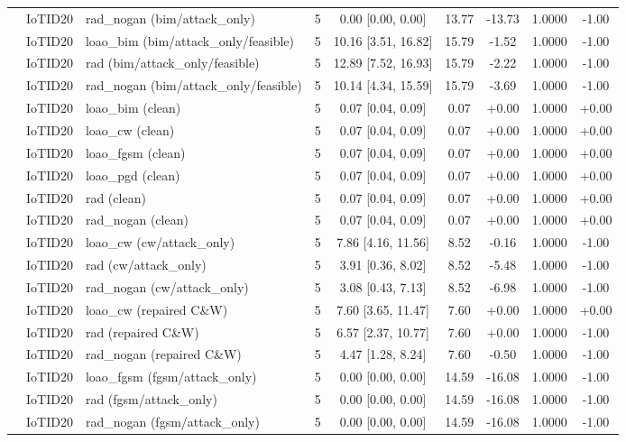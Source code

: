 \begin{table}[t]
\begin{tabular}{lllcccccc}
 & IoTID20 & rad\_nogan (bim/attack\_only) & 5 & 0.00 [0.00, 0.00] & 13.77 & -13.73 & 1.0000 & -1.00 \\
 & IoTID20 & loao\_bim (bim/attack\_only/feasible) & 5 & 10.16 [3.51, 16.82] & 15.79 & -1.52 & 1.0000 & -1.00 \\
 & IoTID20 & rad (bim/attack\_only/feasible) & 5 & 12.89 [7.52, 16.93] & 15.79 & -2.22 & 1.0000 & -1.00 \\
 & IoTID20 & rad\_nogan (bim/attack\_only/feasible) & 5 & 10.14 [4.34, 15.59] & 15.79 & -3.69 & 1.0000 & -1.00 \\
 & IoTID20 & loao\_bim (clean) & 5 & 0.07 [0.04, 0.09] & 0.07 & +0.00 & 1.0000 & +0.00 \\
 & IoTID20 & loao\_cw (clean) & 5 & 0.07 [0.04, 0.09] & 0.07 & +0.00 & 1.0000 & +0.00 \\
 & IoTID20 & loao\_fgsm (clean) & 5 & 0.07 [0.04, 0.09] & 0.07 & +0.00 & 1.0000 & +0.00 \\
 & IoTID20 & loao\_pgd (clean) & 5 & 0.07 [0.04, 0.09] & 0.07 & +0.00 & 1.0000 & +0.00 \\
 & IoTID20 & rad (clean) & 5 & 0.07 [0.04, 0.09] & 0.07 & +0.00 & 1.0000 & +0.00 \\
 & IoTID20 & rad\_nogan (clean) & 5 & 0.07 [0.04, 0.09] & 0.07 & +0.00 & 1.0000 & +0.00 \\
 & IoTID20 & loao\_cw (cw/attack\_only) & 5 & 7.86 [4.16, 11.56] & 8.52 & -0.16 & 1.0000 & -1.00 \\
 & IoTID20 & rad (cw/attack\_only) & 5 & 3.91 [0.36, 8.02] & 8.52 & -5.48 & 1.0000 & -1.00 \\
 & IoTID20 & rad\_nogan (cw/attack\_only) & 5 & 3.08 [0.43, 7.13] & 8.52 & -6.98 & 1.0000 & -1.00 \\
 & IoTID20 & loao\_cw (repaired C\&W) & 5 & 7.60 [3.65, 11.47] & 7.60 & +0.00 & 1.0000 & +0.00 \\
 & IoTID20 & rad (repaired C\&W) & 5 & 6.57 [2.37, 10.77] & 7.60 & +0.00 & 1.0000 & -1.00 \\
 & IoTID20 & rad\_nogan (repaired C\&W) & 5 & 4.47 [1.28, 8.24] & 7.60 & -0.50 & 1.0000 & -1.00 \\
 & IoTID20 & loao\_fgsm (fgsm/attack\_only) & 5 & 0.00 [0.00, 0.00] & 14.59 & -16.08 & 1.0000 & -1.00 \\
 & IoTID20 & rad (fgsm/attack\_only) & 5 & 0.00 [0.00, 0.00] & 14.59 & -16.08 & 1.0000 & -1.00 \\
 & IoTID20 & rad\_nogan (fgsm/attack\_only) & 5 & 0.00 [0.00, 0.00] & 14.59 & -16.08 & 1.0000 & -1.00 \\

\end{tabular}
\end{table}
